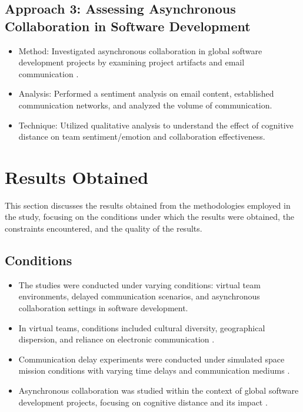 \documentclass[12pt]{article}
\begin{document}
\subsection{Approach 3: Assessing Asynchronous Collaboration in Software Development}
\begin{itemize}
  \item Method: Investigated asynchronous collaboration in global software development projects by examining project artifacts and email communication \cite{ref3}.
  \item Analysis: Performed a sentiment analysis on email content, established communication networks, and analyzed the volume of communication.
  \item Technique: Utilized qualitative analysis to understand the effect of cognitive distance on team sentiment/emotion and collaboration effectiveness.
\end{itemize}

\section{Results Obtained}

This section discusses the results obtained from the methodologies employed in the study, focusing on the conditions under which the results were obtained, the constraints encountered, and the quality of the results.

\subsection{Conditions}
\begin{itemize}
  \item The studies were conducted under varying conditions: virtual team environments, delayed communication scenarios, and asynchronous collaboration settings in software development.
  \item In virtual teams, conditions included cultural diversity, geographical dispersion, and reliance on electronic communication \cite{ref1, ref8}.
  \item Communication delay experiments were conducted under simulated space mission conditions with varying time delays and communication mediums \cite{ref2}.
  \item Asynchronous collaboration was studied within the context of global software development projects, focusing on cognitive distance and its impact \cite{ref3}.
\end{itemize}
\end{document}
